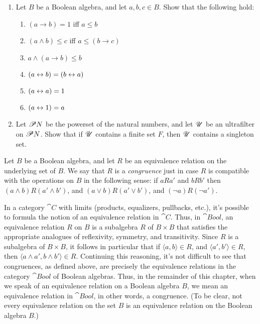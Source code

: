 \begin{exercise} \mbox{}
  
\begin{enumerate}
\item Let $B$ be a Boolean algebra, and let $a,b,c\in B$.  Show that
  the following hold:
\begin{enumerate}
\item $(a\to b)=1$ iff $a\leq b$
\item $(a\wedge b)\leq c$ iff $a\leq (b\to c)$
\item $a\wedge (a\to b)\leq b$
\item $(a\leftrightarrow b) = (b\leftrightarrow a)$
\item $(a\leftrightarrow a)=1$
\item $(a\leftrightarrow 1)=a$
\end{enumerate}
\item Let $\mathscr P N$ be the powerset of the natural numbers, and let
  $\mathscr U$ be an ultrafilter on $\mathscr P N$.  Show that if $\mathscr U$ contains a
  finite set $F$, then $\mathscr U$ contains a singleton set.
\end{enumerate}
\end{exercise}

\begin{defn} Let $B$ be a Boolean algebra, and let $R$ be an
  equivalence relation on the underlying set of $B$.  We say that $R$
  is a \emph{congruence} just in case $R$ is compatible with the
  operations on $B$ in the following sense: if $aRa'$ and $bRb'$ then
  $(a\wedge b)R(a'\wedge b')$, and $(a\vee b)R(a'\vee b')$, and $(\neg
  a)R(\neg a')$. \end{defn}

In a category $\cat{C}$ with limits (products, equalizers, pullbacks,
etc.), it's possible to formula the notion of an equivalence relation
in $\cat{C}$.  Thus, in $\cat{Bool}$, an equivalence relation $R$ on
$B$ is a subalgebra $R$ of $B\times B$ that satisfies the appropriate
analogues of reflexivity, symmetry, and transitivity.  Since $R$ is a
subalgebra of $B\times B$, it follows in particular that if $\langle
a,b\rangle \in R$, and $\langle a',b'\rangle\in R$, then $\langle
a\wedge a',b\wedge b'\rangle \in R$.  Continuing this reasoning, it's
not difficult to see that congruences, as defined above, are precisely
the equivalence relations in the category $\cat{Bool}$ of Boolean
algebras.  Thus, in the remainder of this chapter, when we speak of an
equivalence relation on a Boolean algebra $B$, we mean an equivalence
relation in $\cat{Bool}$, in other words, a congruence.  (To be clear,
not every equivalence relation on the set $B$ is an equivalence
relation on the Boolean algebra $B$.)

